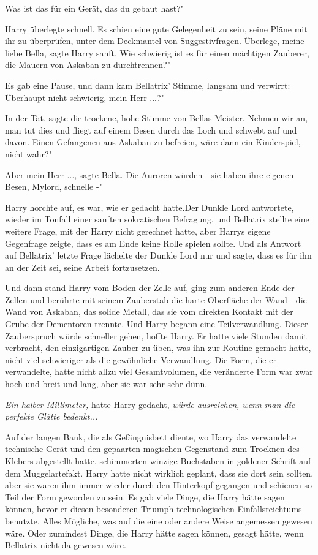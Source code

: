 \glqq{}Was ist das für ein Gerät, das du gebaut hast?"

Harry überlegte schnell. Es schien eine gute Gelegenheit zu sein, seine Pläne
mit ihr zu überprüfen, unter dem Deckmantel von Suggestivfragen. \glqq{}Überlege,
meine liebe Bella\grqq{}, sagte Harry sanft. \glqq{}Wie schwierig ist es für
einen mächtigen Zauberer, die Mauern von Askaban zu durchtrennen?"

Es gab eine Pause, und dann kam Bellatrix' Stimme, langsam und verwirrt: \glqq{}
Überhaupt nicht schwierig, mein Herr ...?"

\glqq{}In der Tat\grqq{}, sagte die trockene, hohe Stimme von Bellas Meister.
\glqq{}Nehmen wir an, man tut dies und fliegt auf einem Besen durch das Loch und
schwebt auf und davon. Einen Gefangenen aus Askaban zu befreien, wäre dann ein
Kinderspiel, nicht wahr?"

\glqq{}Aber mein Herr ...\grqq{}, sagte Bella. \glqq{}Die Auroren würden - sie
haben ihre eigenen Besen, Mylord, schnelle -"

Harry horchte auf, es war, wie er gedacht hatte.Der Dunkle Lord antwortete,
wieder im Tonfall einer sanften sokratischen Befragung, und Bellatrix stellte
eine weitere Frage, mit der Harry nicht gerechnet hatte, aber Harrys eigene
Gegenfrage zeigte, dass es am Ende keine Rolle spielen sollte. Und als Antwort
auf Bellatrix' letzte Frage lächelte der Dunkle Lord nur und sagte, dass es für
ihn an der Zeit sei, seine Arbeit fortzusetzen.

Und dann stand Harry vom Boden der Zelle auf, ging zum anderen Ende der Zellen
und berührte mit seinem Zauberstab die harte Oberfläche der Wand - die Wand von
Askaban, das solide Metall, das sie vom direkten Kontakt mit der Grube der
Dementoren trennte. Und Harry begann eine Teilverwandlung. Dieser Zauberspruch
würde schneller gehen, hoffte Harry. Er hatte viele Stunden damit verbracht, den
einzigartigen Zauber zu üben, was ihn zur Routine gemacht hatte, nicht viel
schwieriger als die gewöhnliche Verwandlung. Die Form, die er verwandelte, hatte
nicht allzu viel Gesamtvolumen, die veränderte Form war zwar hoch und breit und
lang, aber sie war sehr sehr dünn.

\emph{Ein halber Millimeter,} hatte Harry gedacht, \emph{würde ausreichen, wenn
man die perfekte Glätte bedenkt...}

Auf der langen Bank, die als Gefängnisbett diente, wo Harry das verwandelte
technische Gerät und den gepaarten magischen Gegenstand zum Trocknen des Klebers
abgestellt hatte, schimmerten winzige Buchstaben in goldener Schrift auf dem
Muggelartefakt. Harry hatte nicht wirklich geplant, dass sie dort sein sollten,
aber sie waren ihm immer wieder durch den Hinterkopf gegangen und schienen so
Teil der Form geworden zu sein. Es gab viele Dinge, die Harry hätte sagen
können, bevor er diesen besonderen Triumph technologischen Einfallsreichtums
benutzte. Alles Mögliche, was auf die eine oder andere Weise angemessen gewesen
wäre. Oder zumindest Dinge, die Harry hätte sagen können, gesagt hätte, wenn
Bellatrix nicht da gewesen wäre.

